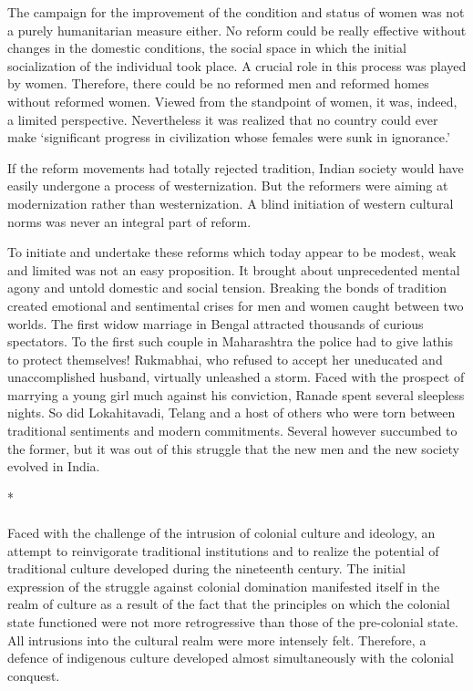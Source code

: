 The campaign for the improvement of the condition and status of women was not a purely humanitarian measure either. No reform could be really effective without changes in the domestic conditions, the social space in which the initial socialization of the individual took place. A crucial role in this process was played by women. Therefore, there could be no reformed men and reformed homes without reformed women. Viewed from the standpoint of women, it was, indeed, a limited perspective. Nevertheless it was realized that no country could ever make `significant progress in civilization whose females were sunk in ignorance.'

If the reform movements had totally rejected tradition, Indian society would have easily undergone a process of westernization. But the reformers were aiming at modernization rather than westernization. A blind initiation of western cultural norms was never an integral part of reform.

To initiate and undertake these reforms which today appear to be modest, weak and limited was not an easy proposition. It brought about unprecedented mental agony and untold domestic and social tension. Breaking the bonds of tradition created emotional and sentimental crises for men and women caught between two worlds. The first widow marriage in Bengal attracted thousands of curious spectators. To the first such couple in Maharashtra the police had to give lathis to protect themselves! Rukmabhai, who refused to accept her uneducated and unaccomplished husband, virtually unleashed a storm. Faced with the prospect of marrying a young girl much against his conviction, Ranade spent several sleepless nights. So did Lokahitavadi, Telang and a host of others who were torn between traditional sentiments and modern commitments. Several however succumbed to the former, but it was out of this struggle that the new men and the new society evolved in India.

\begin{center}*\end{center}

\paragraph*{}

Faced with the challenge of the intrusion of colonial culture and ideology, an attempt to reinvigorate traditional institutions and to realize the potential of traditional culture developed during the nineteenth century. The initial expression of the struggle against colonial domination manifested itself in the realm of culture as a result of the fact that the principles on which the colonial state functioned were not more retrogressive than those of the pre-colonial state. All intrusions into the cultural realm were more intensely felt. Therefore, a defence of indigenous culture developed almost simultaneously with the colonial conquest.

